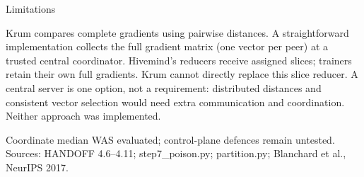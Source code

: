 \documentclass[aspectratio=169]{beamer}
\renewcommand{\Chalmersinsertpagenumber}{\insertframenumber\,/\,\insertmainframenumber}
\begin{document}
\begin{frame}[label=result-limitations]{Limitations}
{\par Krum compares complete gradients using pairwise distances. A straightforward
implementation collects the full gradient matrix (one vector per peer) at a trusted
central coordinator. Hivemind's reducers receive assigned slices; trainers retain their
own full gradients. Krum cannot directly replace this slice reducer. A central server
is one option, not a requirement: distributed distances and consistent vector selection
would need extra communication and coordination. Neither approach was implemented.
\par Coordinate median WAS evaluated; control-plane defences remain untested.
Sources: HANDOFF 4.6--4.11; step7\_poison.py; partition.py; Blanchard et al., NeurIPS 2017.}
\end{frame}

% 
% 
\end{document}
